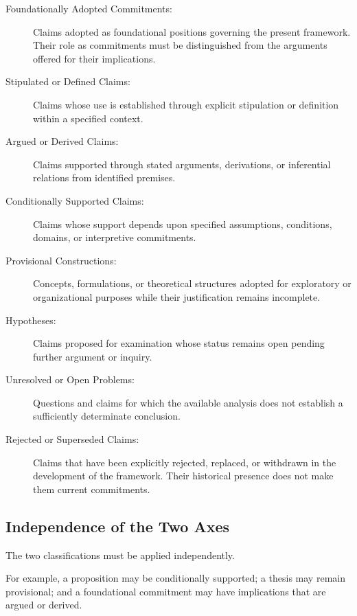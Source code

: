 \begin{description}

    \item[Foundationally Adopted Commitments:]
    Claims adopted as foundational positions governing the present
    framework. Their role as commitments must be distinguished
    from the arguments offered for their implications.

    \item[Stipulated or Defined Claims:]
    Claims whose use is established through explicit stipulation
    or definition within a specified context.

    \item[Argued or Derived Claims:]
    Claims supported through stated arguments, derivations, or
    inferential relations from identified premises.

    \item[Conditionally Supported Claims:]
    Claims whose support depends upon specified assumptions,
    conditions, domains, or interpretive commitments.

    \item[Provisional Constructions:]
    Concepts, formulations, or theoretical structures adopted
    for exploratory or organizational purposes while their
    justification remains incomplete.

    \item[Hypotheses:]
    Claims proposed for examination whose status remains open
    pending further argument or inquiry.

    \item[Unresolved or Open Problems:]
    Questions and claims for which the available analysis does
    not establish a sufficiently determinate conclusion.

    \item[Rejected or Superseded Claims:]
    Claims that have been explicitly rejected, replaced, or
    withdrawn in the development of the framework. Their
    historical presence does not make them current commitments.

\end{description}


\subsection*{Independence of the Two Axes}

The two classifications must be applied independently.

For example, a proposition may be conditionally supported; a thesis
may remain provisional; and a foundational commitment may have
implications that are argued or derived.

